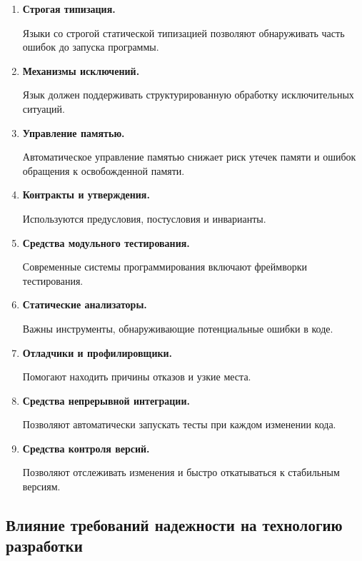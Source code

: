 \documentclass[12pt,a4paper]{article}
\begin{document}
\begin{enumerate}
    \item \textbf{Строгая типизация.}

    Языки со строгой статической типизацией позволяют обнаруживать часть ошибок до запуска программы.

    \item \textbf{Механизмы исключений.}

    Язык должен поддерживать структурированную обработку исключительных ситуаций.

    \item \textbf{Управление памятью.}

    Автоматическое управление памятью снижает риск утечек памяти и ошибок обращения к освобожденной памяти.

    \item \textbf{Контракты и утверждения.}

    Используются предусловия, постусловия и инварианты.

    \item \textbf{Средства модульного тестирования.}

    Современные системы программирования включают фреймворки тестирования.

    \item \textbf{Статические анализаторы.}

    Важны инструменты, обнаруживающие потенциальные ошибки в коде.

    \item \textbf{Отладчики и профилировщики.}

    Помогают находить причины отказов и узкие места.

    \item \textbf{Средства непрерывной интеграции.}

    Позволяют автоматически запускать тесты при каждом изменении кода.

    \item \textbf{Средства контроля версий.}

    Позволяют отслеживать изменения и быстро откатываться к стабильным версиям.
\end{enumerate}

\subsection{Влияние требований надежности на технологию разработки}
\end{document}
